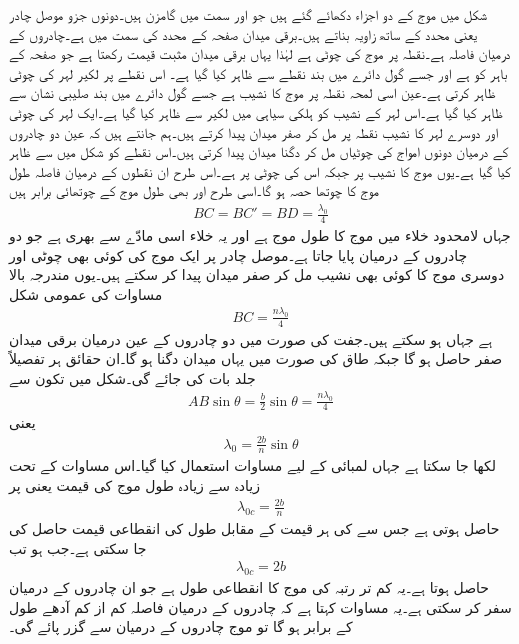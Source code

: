 شکل  میں  موج کے دو  اجزاء دکھائے گئے ہیں جو  اور  سمت میں گامزن ہیں۔دونوں جزو موصل چادر یعنی  محدد کے ساتھ  زاویہ بناتے ہیں۔برقی میدان صفحہ کے   محدد کی سمت میں ہے۔چادروں کے درمیان فاصلہ  ہے۔نقطہ  پر موج  کی چوٹی ہے لہٰذا یہاں برقی میدان  مثبت  قیمت رکھتا ہے جو صفحہ کے  باہر کو ہے اور جسے گول دائرے میں بند نقطے سے ظاہر کیا گیا ہے۔ اس نقطے پر لکیر  لہر کی چوٹی ظاہر کرتی ہے۔عین اسی لمحہ نقطہ  پر موج  کا نشیب ہے جسے گول دائرے میں بند صلیبی نشان سے ظاہر کیا گیا ہے۔اس لہر کے نشیب کو ہلکی سیاہی میں لکیر  سے ظاہر کیا گیا ہے۔ایک لہر کی چوٹی اور دوسرے لہر کا نشیب نقطہ  پر مل کر صفر میدان پیدا کرتے ہیں۔ہم جانتے ہیں کہ عین دو چادروں کے درمیان دونوں امواج کی چوٹیاں مل کر دگنا میدان پیدا کرتی ہیں۔اس نقطے کو شکل میں  سے ظاہر کیا گیا ہے۔یوں موج  کا نشیب  پر جبکہ اس کی چوٹی  پر ہے۔اس طرح ان نقطوں کے درمیان فاصلہ طول موج کا چوتھا حصہ ہو گا۔اسی طرح  اور  بھی طول موج کے چوتھائی برابر  ہیں
\begin{align}
BC=BC'=BD=\frac{\lambda_0}{4}
\end{align}
جہاں لامحدود خلاء میں  موج کا طول موج  ہے اور یہ خلاء اسی مادّے سے بھری ہے جو دو چادروں کے درمیان پایا جاتا ہے۔موصل چادر پر ایک موج کی کوئی بھی چوٹی اور دوسری موج کا کوئی بھی نشیب مل کر صفر میدان پیدا کر سکتے ہیں۔یوں مندرجہ بالا مساوات کی عمومی شکل
\begin{align}\label{مساوات_مویج_چوٹی_نشیب_ختم_عمومی}
BC=\frac{n \lambda_0}{4}
\end{align}
ہے جہاں  ہو سکتے ہیں۔جفت  کی صورت میں دو چادروں کے عین درمیان برقی میدان صفر حاصل ہو گا جبکہ طاق  کی صورت میں یہاں میدان دگنا ہو گا۔ان حقائق ہر تفصیلاً جلد بات کی جائے گی۔شکل  میں تکون  سے
\begin{align*}
AB \sin \theta = \frac{b}{2}\sin \theta =\frac{n \lambda_0}{4}
\end{align*}
یعنی
\begin{align}\label{مساوات_مویج_طول_اور_درجہ_انداز}
\lambda_0 = \frac{2b}{n} \sin \theta
\end{align}
لکھا جا سکتا ہے جہاں لمبائی  کے لیے مساوات  استعمال کیا گیا۔اس مساوات کے تحت زیادہ سے زیادہ طول موج  کی قیمت  یعنی  پر
\begin{align}\label{مساوات_مویج_طول_موج_بالمقابل_درجہ_موج}
\lambda_{0c}=\frac{2b}{n}
\end{align}
 حاصل ہوتی ہے جس سے  کی ہر قیمت کے مقابل طول کی انقطاعی قیمت حاصل کی جا سکتی ہے۔جب  ہو تب
 \begin{align}\label{مساوات_مویج_دو_چادر_انقطاعی_طول_موج}
\lambda_{0c}=2b
\end{align}
حاصل ہوتا ہے۔یہ کم تر رتبہ کی  موج کا انقطاعی طول ہے جو ان چادروں کے درمیان سفر کر سکتی ہے۔یہ مساوات کہتا ہے کہ چادروں کے درمیان فاصلہ کم از کم آدھے طول کے برابر ہو گا تو موج چادروں کے درمیان سے گزر پائے گی۔

